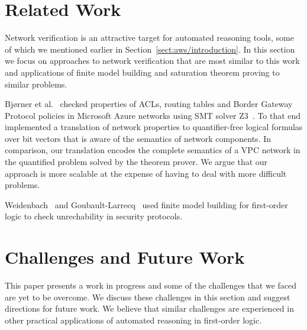 \section{Related Work}
\label{sect:aws/related}

Network verification is an attractive target for automated reasoning tools, some of which we mentioned earlier in Section~\ref{sect:aws/introduction}. In this section we focus on approaches to network verification that are most similar to this work and applications of finite model building and saturation theorem proving to similar problems.

Bj\o{}rner et al.~\cite{DBLP:conf/icdcit/BjornerJ15} checked properties of ACLs, routing tables and Border Gateway Protocol policies in Microsoft Azure networks using SMT solver Z3~\cite{Z3}. To that end \cite{DBLP:conf/icdcit/BjornerJ15} implemented a translation of network properties to quantifier-free logical formulas over bit vectors that is aware of the semantics of network components. In comparison, our translation encodes the complete semantics of a VPC network in the quantified problem solved by the theorem prover. We argue that our approach is more scalable at the expense of having to deal with more difficult problems.

Weidenbach~\cite{Weidenbach99} and Goubault-Larrecq~\cite{DBLP:journals/jcs/Goubault-Larrecq10} used finite model building for first-order logic to check unrechability in security protocols.







\section{Challenges and Future Work}
\label{sect:aws/challenges}
This paper presents a work in progress and some of the challenges that we faced are yet to be overcome. We discuss these challenges in this section and suggest directions for future work. We believe that similar challenges are experienced in other practical applications of automated reasoning in first-order logic.


